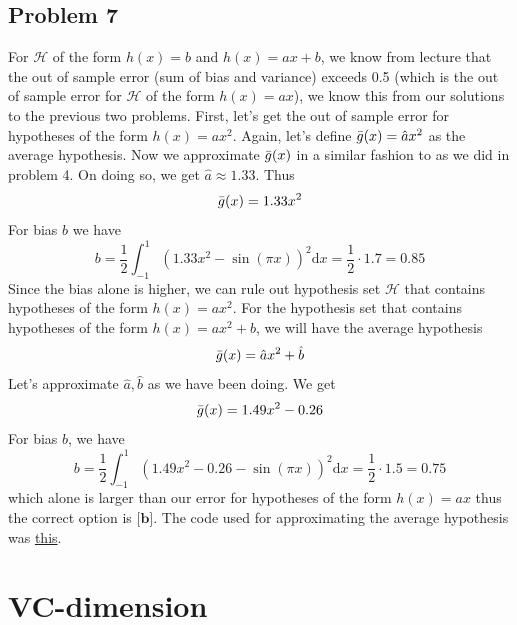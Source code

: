 \documentclass{article}
\begin{document}
\subsection*{Problem 7}
For $\mathcal{H}$ of the form $h(x) = b$ and $h(x) = ax + b$, we know from lecture that the out of sample error (sum of bias and variance) exceeds 0.5 (which is the out of sample error for $\mathcal{H}$ of the form $h(x) = ax$), we know this from our solutions to the previous two problems. First, let's get the out of sample error for hypotheses of the form $h(x) = ax^2$. Again, let's define $\Bar{g}(x) = \hat{a}x^2$ as the average hypothesis. Now we approximate $\Bar{g}(x)$ in a similar fashion to as we did in problem 4. On doing so, we get $\hat{a} \approx 1.33$. Thus 
\begin{equation*}
    \Bar{g}(x) = 1.33x^2
\end{equation*}
For bias $b$ we have
\begin{equation*}
    b = \frac{1}{2}\int_{-1}^{1}(1.33x^2 - \sin(\pi x))^2\text{d}x = \frac{1}{2}\cdot 1.7 = 0.85
\end{equation*}
Since the bias alone is higher, we can rule out hypothesis set $\mathcal{H}$ that contains hypotheses of the form $h(x) = ax^2$. For the hypothesis set that contains hypotheses of the form $h(x) = ax^2 + b$, we will have the average hypothesis
\begin{equation*}
    \Bar{g}(x) = \hat{a}x^2 + \hat{b}
\end{equation*}
Let's approximate $\hat{a}, \hat{b}$ as we have been doing. We get
\begin{equation*}
\Bar{g}(x) = 1.49x^2 - 0.26
\end{equation*}
For bias $b$, we have
\begin{equation*}
    b = \frac{1}{2}\int_{-1}^{1}(1.49x^2 - 0.26 - \sin(\pi x))^2\text{d}x = \frac{1}{2}\cdot 1.5 = 0.75
\end{equation*}
which alone is larger than our error for hypotheses of the form $h(x) = ax$ thus the correct option is $\textbf{[b]}$. The code used for approximating the average hypothesis was \hyperref[prob7]{this}.
\newpage
\section*{VC-dimension}
\end{document}
